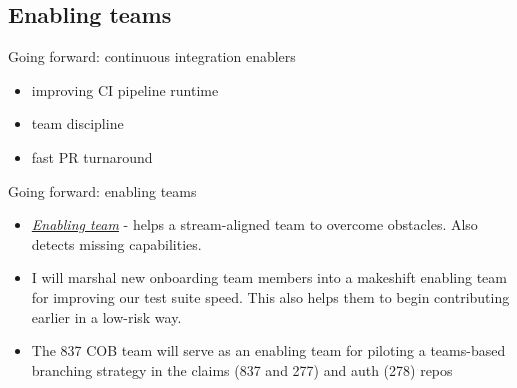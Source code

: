 \documentclass{beamer}
\begin{document}
	\subsection{Enabling teams}
	\begin{frame}{Going forward: continuous integration enablers}
		\begin{itemize}
			\item improving CI pipeline runtime \pause
			\item team discipline \pause
			\item fast PR turnaround \pause
		\end{itemize}
	\end{frame}	
	\begin{frame}{Going forward: enabling teams}
		\begin{itemize}
			\item \textit{\underline{Enabling team}} - helps a stream-aligned team to overcome obstacles. Also detects missing capabilities. \pause
			\item I will marshal new onboarding team members into a makeshift enabling team for improving our test suite speed. This also helps them to begin contributing earlier in a low-risk way. \pause
			\item The 837 COB team will serve as an enabling team for piloting a teams-based branching strategy in the claims (837 and 277) and auth (278) repos \pause
		\end{itemize}
	\end{frame}
\end{document}
